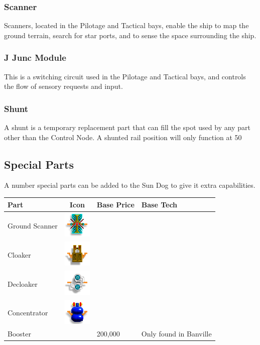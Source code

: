 \subsubsection{Scanner}

Scanners, located in the Pilotage and Tactical bays, enable the ship to map the ground terrain, search for star ports, and to sense the space surrounding the ship. 

\subsubsection{J Junc Module}

This is a switching circuit used in the Pilotage and Tactical bays, and controls the flow of sensory requests and input. 

\subsubsection{Shunt}

A shunt is a temporary replacement part that can fill the spot used by any part other than the Control Node. A shunted rail position will only function at 50%

\subsection{Special Parts}
A number special parts can be added to the Sun Dog to give it extra
capabilities.

\begin{tabular}{| l | c | l | l |}
\hline
Part & Icon & Base Price & Base Tech \\
\hline
Ground Scanner & \includegraphics[scale=0.70]{images/part-groundscanner.png} & & \\
Cloaker & \includegraphics[scale=0.70]{images/part-cloaker.png} & & \\
Decloaker & \includegraphics[scale=0.70]{images/part-decloaker.png} & & \\
Concentrator & \includegraphics[scale=0.70]{images/part-concentrator.png} & & \\
Booster & & 200,000 & Only found in Banville \\
\hline
\end{tabular}

